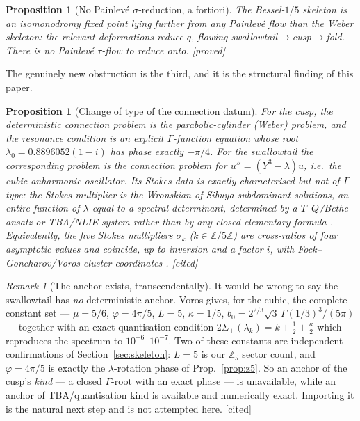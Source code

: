 \documentclass[11pt,reqno]{amsart}
\theoremstyle{plain}
\newtheorem{proposition}[theorem]{Proposition}
\theoremstyle{definition}
\theoremstyle{remark}
\newtheorem{remark}[theorem]{Remark}
\newcommand{\tagP}{{\footnotesize\textsf{[proved]}}}
\newcommand{\tagC}{{\footnotesize\textsf{[cited]}}}
\begin{document}
\begin{proposition}[No Painlev\'e $\sigma$-reduction, a fortiori]\label{prop:nopainleve}
The Bessel-$1/5$ skeleton is an isomonodromy fixed point lying \emph{further} from any Painlev\'e
flow than the Weber skeleton: the relevant deformations reduce $q$, flowing
swallowtail$\to$cusp$\to$fold. There is no Painlev\'e $\tau$-flow to reduce onto. \tagP
\end{proposition}

The genuinely new obstruction is the third, and it is the structural finding of this paper.

\begin{proposition}[Change of type of the connection datum]\label{prop:connection}
For the cusp, the deterministic connection problem is the parabolic-cylinder (Weber) problem, and
the resonance condition is an explicit $\Gamma$-function equation whose root
$\lambda_0=0.8896052(1-i)$ has phase \emph{exactly} $-\pi/4$. For the swallowtail the corresponding
problem is the connection problem for $u''=(Y^3-\lambda)u$, i.e.\ the \emph{cubic anharmonic
oscillator}. Its Stokes data is \emph{exactly characterised but not of $\Gamma$-type}: the Stokes
multiplier is the Wronskian of Sibuya subdominant solutions, an entire function of $\lambda$ equal
to a spectral determinant, determined by a $T$--$Q$/Bethe-ansatz or TBA/NLIE system rather than by
any closed elementary formula \cite{DoreyDunningTateo,Masoero2010,ItoMarinoShu}. Equivalently, the
five Stokes multipliers $\sigma_k$ ($k\in\mathbb Z/5\mathbb Z$) are cross-ratios of four asymptotic
values and coincide, up to inversion and a factor $i$, with Fock--Goncharov/Voros cluster
coordinates \cite{AllegrettiBridgeland}. \tagC
\end{proposition}

\begin{remark}[The anchor exists, transcendentally]\label{rem:anchorexists}
It would be wrong to say the swallowtail has \emph{no} deterministic anchor. Voros
\cite{Voros1999} gives, for the cubic, the complete constant set --- $\mu=5/6$, $\varphi=4\pi/5$,
$L=5$, $\kappa=1/5$, $b_0=2^{2/3}\sqrt3\,\Gamma(1/3)^3/(5\pi)$ --- together with an exact
quantisation condition $2\Sigma_\pm(\lambda_k)=k+\tfrac12\pm\tfrac\kappa2$ which reproduces the
spectrum to $10^{-6}$--$10^{-7}$. Two of these constants are independent confirmations of
Section~\ref{sec:skeleton}: $L=5$ is our $\mathbb Z_5$ sector count, and $\varphi=4\pi/5$ is exactly
the $\lambda$-rotation phase of Prop.~\ref{prop:z5}. So an anchor of the cusp's \emph{kind} ---
a closed $\Gamma$-root with an exact phase --- is unavailable, while an anchor of TBA/quantisation
kind is available and numerically exact. Importing it is the natural next step and is not attempted
here. \tagC
\end{remark}
\end{document}
